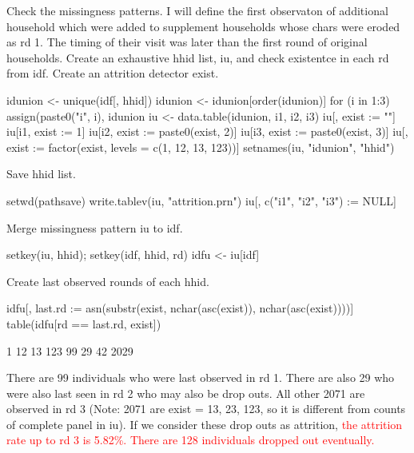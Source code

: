 Check the missingness patterns. I will define the first observaton of additional household which were added to supplement households whose chars were eroded as rd 1. The timing of their visit was later than the first round of original households. Create an exhaustive \textsf{hhid} list, \textsf{iu}, and check existentce in each rd from \textsf{idf}. Create an attrition detector \textsf{exist}.
\begin{Schunk}
\begin{Sinput}
idunion <- unique(idf[, hhid])
idunion <- idunion[order(idunion)]
for (i in 1:3) assign(paste0("i", i), idunion %in% idfiles[[i]][ ,hhid])
iu <- data.table(idunion, i1, i2, i3)
iu[, exist := ""]
iu[i1, exist := 1]
iu[i2, exist := paste0(exist, 2)]
iu[i3, exist := paste0(exist, 3)]
iu[, exist := factor(exist, levels = c(1, 12, 13, 123))]
setnames(iu, "idunion", "hhid")
\end{Sinput}
\end{Schunk}
Save hhid list.
\begin{Schunk}
\begin{Sinput}
setwd(pathsave)
write.tablev(iu, "attrition.prn")
iu[, c("i1", "i2", "i3") := NULL]
\end{Sinput}
\end{Schunk}
Merge missingness pattern \textsf{iu} to \textsf{idf}. 
\begin{Schunk}
\begin{Sinput}
setkey(iu, hhid); setkey(idf, hhid, rd)
idfu <- iu[idf]
\end{Sinput}
\end{Schunk}
Create last observed rounds of each hhid. 
\begin{Schunk}
\begin{Sinput}
idfu[, last.rd := asn(substr(exist, nchar(asc(exist)), nchar(asc(exist))))]
table(idfu[rd == last.rd, exist])
\end{Sinput}
\begin{Soutput}

   1   12   13  123 
  99   29   42 2029 
\end{Soutput}
\end{Schunk}

There are 99 individuals who were last observed in rd 1. There are also 29 who were also last seen in rd 2 who may also be drop outs. All other 2071 are observed in rd 3 (Note: 2071 are \textsf{exist} = 13, 23, 123, so it is different from counts of complete panel in \textsf{iu}). If we consider these drop outs as attrition, \textcolor{red}{the attrition rate up to rd 3 is 5.82\%. There are 128 individuals dropped out eventually.} 

